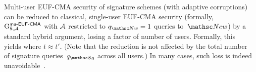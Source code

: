 Multi-user EUF-CMA security of signature schemes (with adaptive corruptions) can be reduced to classical, single-user EUF-CMA security (formally, $\textnormal{G}^{\mathsf{mu{\text{\normalfont-}}EUF{\text{\normalfont-}}CMA}}_{\mathsf{S},\mathcal{A}}$ with $\mathcal{A}$ restricted to $\qNew = 1$ queries to~$\New$) by a standard hybrid argument, losing a factor of number of users.
Formally, this yields
where $t \approx t'$.
(Note that the reduction is not affected by the total number of signature queries~$\qSign$ across all users.)
In many cases, such loss is indeed unavoidable~\cite{EC:BJLS16}.




% 	
% 		
% 		
% 		
% 		
% 		
% 		
% 		
% 		
% 		
% 		
